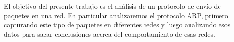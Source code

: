 El objetivo del presente trabajo es el análisis de un protocolo de envío de paquetes en una red. En particular analizaremos el protocolo ARP, primero capturando este tipo de paquetes en diferentes redes y luego analizando esos datos para sacar conclusiones acerca del comportamiento de esas redes.